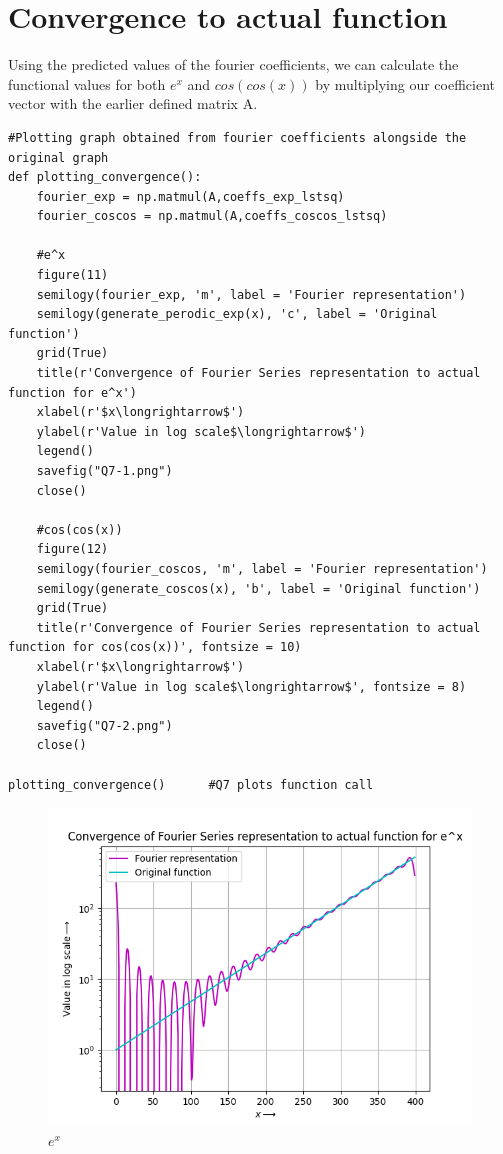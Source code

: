 \documentclass[11pt, a4paper]{article}
\begin{document}
\section{Convergence to actual function}
\par Using the predicted values of the fourier coefficients, we can calculate the functional values for both $e^x$ and $cos(cos(x))$ by multiplying our coefficient vector with the earlier defined matrix A.
\begin{lstlisting}
#Plotting graph obtained from fourier coefficients alongside the original graph
def plotting_convergence():
    fourier_exp = np.matmul(A,coeffs_exp_lstsq)
    fourier_coscos = np.matmul(A,coeffs_coscos_lstsq)

    #e^x
    figure(11)
    semilogy(fourier_exp, 'm', label = 'Fourier representation')
    semilogy(generate_perodic_exp(x), 'c', label = 'Original function')
    grid(True)
    title(r'Convergence of Fourier Series representation to actual function for e^x')
    xlabel(r'$x\longrightarrow$')
    ylabel(r'Value in log scale$\longrightarrow$')
    legend()
    savefig("Q7-1.png")
    close()

    #cos(cos(x))
    figure(12)
    semilogy(fourier_coscos, 'm', label = 'Fourier representation')
    semilogy(generate_coscos(x), 'b', label = 'Original function')
    grid(True)
    title(r'Convergence of Fourier Series representation to actual function for cos(cos(x))', fontsize = 10)
    xlabel(r'$x\longrightarrow$')
    ylabel(r'Value in log scale$\longrightarrow$', fontsize = 8)
    legend()
    savefig("Q7-2.png")
    close()
    
plotting_convergence()      #Q7 plots function call
\end{lstlisting}
\begin{figure}[!tbh]
    \centering
    \includegraphics[scale = 0.7]{Q7-1.png}
    \caption{$e^x$}
    \label{fig:Figure 11}
\end{figure}
\end{document}
